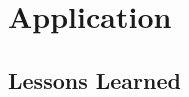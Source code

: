 \chapter{Application}\label{chap:application}

\newcommand{\download}{Download\xspace}
\newcommand{\live}{Live\xspace}
\newcommand{\serviceprovisioning}{Provisioning\xspace}
\newcommand{\streaming}{Streaming\xspace}






\section{Lessons Learned}
